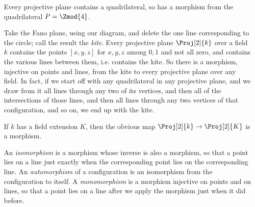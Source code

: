 \begin{example}
Every projective plane contains a quadrilateral, so has a morphism from the quadrilateral \(P=\Zmod{4}\).
\end{example}
\begin{example}
Take the Fano plane, using our diagram, and delete the one line corresponding to the circle; call the result the \emph{kite}.
Every projective plane \(\Proj[2]{k}\) over a field \(k\) contains the points
\([x,y,z]\) for \(x,y,z\) among \(0,1\) and not all zero, and contains the various lines between them, i.e. contains the kite.
So there is a morphism, injective on points and lines, from the kite to every projective plane over any field.
In fact, if we start off with any quadrilateral in any projective plane, and we draw from it all lines through any two of its vertices, and then all of the intersections of those lines, and then all lines through any two vertices of that configuration, and so on, we end up with the kite.
\end{example}
\begin{example}
If \(k\) has a field extension \(K\), then the obvious map \(\Proj[2]{k} \to \Proj[2]{K}\) is a morphism.
\end{example}
An \emph{isomorphism} is a morphism whose inverse is also a morphism, so that a point lies on a line just exactly when the corresponding point lies on the corresponding line.
An \emph{automorphism} of a configuration is an isomorphism from the configuration to itself.
A \emph{monomorphism} is a morphism injective on points and on lines, so that a point lies on a line after we apply the morphism just when it did before.

